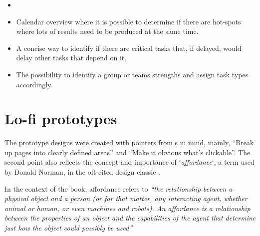 {  \newcommand{\ideaTwo}{%
    Calendar overview where it is possible to determine if there are
    hot-spots where lots of results need to be produced at the same
    time.%
  }

  \newcommand{\ideaThree}{%
    A concise way to identify if there are critical tasks that, if
    delayed, would delay other tasks that depend on it.%
  }

  \newcommand{\ideaFour}{%
    The possibility to identify a group or teams strengths and assign
    task types accordingly.%
  }

  \begin{itemize}
    \item{\ideaOne\label{label_ideas}}
    \item{\ideaTwo}
    \item{\ideaThree}
    \item{\ideaFour}
  \end{itemize}


\section{Lo-fi prototypes}





  The prototype designs were created with pointers from
  \citeauthor{citeDonMakeMeThink}s
  \cite{citeDonMakeMeThink} in mind, mainly,
  ``Break up pages into clearly defined areas'' and ``Make it obvious what's
  clickable''. The second point also reflects the concept and importance of
  `\textit{affordance}`, a term used by Donald Norman, in the oft-cited design classic
  \cite{citeTheDesignOfEverydayThings}.

  In the context of the book, affordance refers to
  \textit{%
  ``the relationship between a physical object
  and a person (or for that matter, any interacting agent, whether animal or
  human, or even machines and robots). An affordance is a relationship
  between the properties of an object and the capabilities of the agent that
  determine just how the object could possibly be used''
  }\cite[p. 11]{citeTheDesignOfEverydayThings}

}
